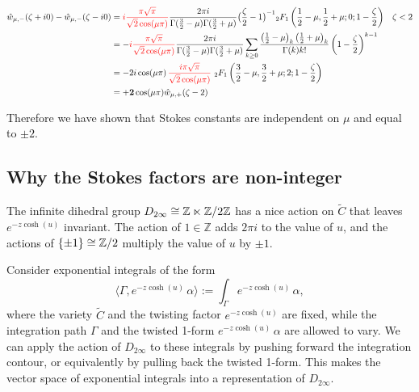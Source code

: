 \documentclass{article}
\newcommand{\Z}{\mathbb{Z}}
\begin{document}
\begin{align*}
\hat{w}_{\mu,-}(\zeta+i0)-\hat{w}_{\mu,-}(\zeta-i0)&=\textcolor{red}{i\frac{\pi\sqrt{\pi}}{\sqrt{2}\cos(\mu \pi)}}\frac{2\pi i}{\Gamma(\tfrac{3}{2}-\mu)\Gamma(\tfrac{3}{2}+\mu)}\big(\frac{\zeta}{2}-1\big)^{-1}{}_2F_1\left(\frac{1}{2}-\mu,\frac{1}{2}+\mu;0;1-\frac{\zeta}{2}\right) & \zeta<2 \\
&=-\textcolor{red}{i\frac{\pi\sqrt{\pi}}{\sqrt{2}\cos(\mu \pi)}}\frac{2\pi i}{\Gamma(\tfrac{3}{2}-\mu)\Gamma(\tfrac{3}{2}+\mu)}\sum_{k\geq 0}\frac{\left(\tfrac{1}{2}-\mu\right)_k\left(\tfrac{1}{2}+\mu\right)_k}{\Gamma(k)k!}\left(1-\frac{\zeta}{2}\right)^{k-1} & \\
&=-2i\cos(\mu \pi)\,\textcolor{red}{\frac{i\pi\sqrt{\pi}}{\sqrt{2}\cos(\mu \pi)}}\,\, {}_2F_1\left(\frac{3}{2}-\mu,\frac{3}{2}+\mu;2;1-\frac{\zeta}{2}\right) & \\
&=\mathbf{+2}\cos(\mu \pi)\hat{w}_{\mu,+}(\zeta-2)
\end{align*}

Therefore we have shown that Stokes constants are independent on $\mu$ and equal to $\pm 2$.
\subsection{Why the Stokes factors are non-integer}
The infinite dihedral group $D_{2\infty} \isom \Z \ltimes \Z/2\Z$ has a nice action on $\tilde{C}$ that leaves $e^{-z \cosh(u)}$ invariant. The action of $1 \in \Z$ adds $2\pi i$ to the value of $u$, and the actions of $\{\pm 1\} \isom \Z/2$ multiply the value of $u$ by $\pm 1$.

Consider exponential integrals of the form
\[ \langle \Gamma, e^{-z \cosh(u)}\,\alpha\rangle := \int_\Gamma e^{-z \cosh(u)}\,\alpha, \]
where the variety $\tilde{C}$ and the twisting factor $e^{-z \cosh(u)}$ are fixed, while the integration path $\Gamma$ and the twisted 1-form $e^{-z \cosh(u)}\,\alpha$ are allowed to vary. We can apply the action of $D_{2\infty}$ to these integrals by pushing forward the integration contour, or equivalently by pulling back the twisted 1-form. This makes the vector space of exponential integrals into a representation of $D_{2\infty}$.
\end{document}
